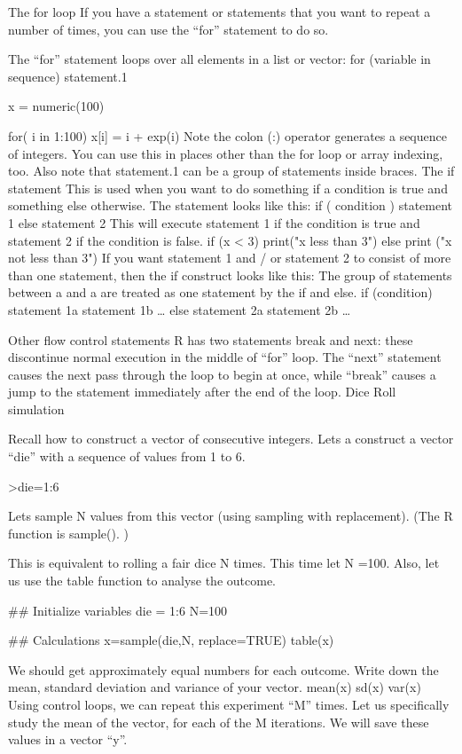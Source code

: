 The for loop 
If you have a statement or statements that you want to repeat a number of times, you can use the “for” statement to do so. 

The “for” statement loops over all elements in a list or vector: 
for (variable in sequence) statement.1 

x = numeric(100)

for( i in 1:100)
{
x[i] = i + exp(i)
}
Note the colon (:) operator generates a sequence of integers. You can use this in places other than the for loop or array indexing, too. Also note that statement.1 can be a group of statements inside braces.
The if statement 
This is used when you want to do something if a condition is true and something else otherwise. The statement looks like this: 
if ( condition ) statement 1 else statement 2 
This will execute statement 1 if the condition is true and statement 2 if the condition is false. 
if (x < 3) print("x less than 3") else print ("x not less than 3")
If you want statement 1 and / or statement 2 to consist of more than one statement, then the if construct looks like this: 
The group of statements between a { and a } are treated as one statement by the if and else. 
if (condition) { 
statement 1a 
statement 1b 
…
} else { 
statement 2a 
statement 2b 
…
} 

Other flow control statements 
R has two statements break and next: these discontinue normal execution in the middle of “for” loop. The “next” statement causes the next pass through the loop to begin at once, while “break” causes a jump to the statement immediately after the end of the loop.
Dice Roll simulation

Recall how to construct a vector of consecutive integers. Lets a construct a  vector “die” with a sequence of values from 1 to 6.

>die=1:6

Lets sample N values from this vector (using sampling with replacement). (The R function is sample(). )

This is equivalent to rolling a fair dice N times. This time let N =100.
Also, let us use the table function to analyse the outcome. 

## Initialize variables
die = 1:6
N=100

## Calculations
x=sample(die,N, replace=TRUE)
table(x)

We should get approximately equal numbers for each outcome.
Write down the mean, standard deviation and variance of your vector.
mean(x)
sd(x)
var(x)
Using control loops, we can repeat this experiment “M” times. Let us specifically study the mean of the vector, for each of the M iterations.
We will save these values in a vector “y”.

